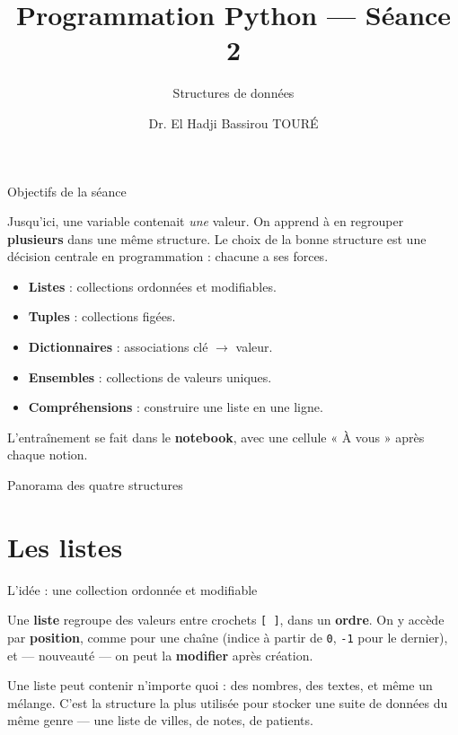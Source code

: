 \documentclass[aspectratio=169,11pt]{beamer}
\title{Programmation Python — Séance 2}
\subtitle{Structures de données}
\author{Dr. El Hadji Bassirou TOURÉ}
\institute{Département de Mathématiques et Informatique\\ Faculté des Sciences et Techniques\\ Université Cheikh Anta Diop de Dakar}
\date{}
\begin{document}
\begin{frame}\titlepage\end{frame}

\begin{frame}{Objectifs de la séance}
\begin{ucaddef}[Contenu]
{\small Jusqu'ici, une variable contenait \emph{une} valeur. On apprend à en regrouper \textbf{plusieurs} dans une même structure. Le choix de la bonne structure est une décision centrale en programmation : chacune a ses forces.}
\end{ucaddef}
\begin{itemize}\small
  \item \textbf{Listes} : collections ordonnées et modifiables.
  \item \textbf{Tuples} : collections figées.
  \item \textbf{Dictionnaires} : associations clé $\rightarrow$ valeur.
  \item \textbf{Ensembles} : collections de valeurs uniques.
  \item \textbf{Compréhensions} : construire une liste en une ligne.
\end{itemize}
{\small L'entraînement se fait dans le \textbf{notebook}, avec une cellule « À vous » après chaque notion.}
\end{frame}

\begin{frame}{Panorama des quatre structures}
\end{frame}

\section{Les listes}

\begin{frame}{L'idée : une collection ordonnée et modifiable}
\begin{ucaddef}
{\small Une \textbf{liste} regroupe des valeurs entre crochets \texttt{[ ]}, dans un \textbf{ordre}. On y accède par \textbf{position}, comme pour une chaîne (indice à partir de \texttt{0}, \texttt{-1} pour le dernier), et — nouveauté — on peut la \textbf{modifier} après création.}
\end{ucaddef}
{\small Une liste peut contenir n'importe quoi : des nombres, des textes, et même un mélange. C'est la structure la plus utilisée pour stocker une suite de données du même genre — une liste de villes, de notes, de patients.}
\end{frame}
\end{document}
